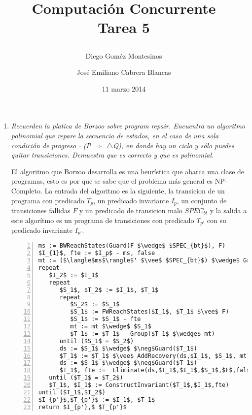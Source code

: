 \documentclass{article}
\title{ Computación Concurrente \\ \Large{Tarea 5}
\author{
  Diego Goméz Montesinos
  \and
  José Emiliano Cabrera Blancas
  }
\date{11 marzo 2014}
}
\begin{document}
\maketitle
\begin{enumerate}
  
\item{
    \textsl{
      Recuerden la platica de Borzoo sobre \textit{program
        repair}. Encuentra un algoritmo polinomial que repare la
      secuencia de estados, en el caso de una sola condición de
      progreso $\square$ (P $\Rightarrow$ $\triangle$Q), en donde hay
      un ciclo y sólo puedes quitar transiciones. Demuestra que es
      correcto y que es polinomial.\\
    }
 
    El algoritmo que Borzoo desarrolla es una heurística que abarca
    una clase de programas, esto es por que se sabe que el problema más
    general es NP-Completo. La entrada del algoritmo es la siguiente,
    la transicion de un programa con predicado $T_p$, un predicado
    invariante $I_p$, un conjunto de transiciones fallidas $F$ y un
    predicado de transicion malo $SPEC_{bt}$ y la salida a este
    algorítmo es un programa de transiciones con predicado $T_{p'}$
    con su predicado invariante $I_{p'}$.\\
    
\begin{lstlisting}[frame=single,mathescape,numbers=left,emph={repeat,until,return},emphstyle=\textbf]
ms := BWReachStates(Guard(F $\wedge$ $SPEC_{bt}$), F)
$I_{1}$, fte := $I_p$ - ms, false
mt := ($\langle$ms$\rangle$' $\vee$ $SPEC_{bt}$) $\wedge$ Group($\neg$ms)
repeat
   $I_2$ := $I_1$
   repeat
      $S_1$, $T_2$ := $I_1$, $T_1$
      repeat
         $S_2$ := $S_1$
         $S_1$ := FWReachStates($I_1$, $T_1$ $\vee$ F)
         $S_1$ := $S_1$ - fte
         mt := mt $\wedge$ $S_1$
         $T_1$ := $T_1$ - Group($T_1$ $\wedge$ mt)
      until ($S_1$ = $S_2$)
      ds := $S_1$ $\wedge$ $\neg$Guard($T_1$)
      $T_1$ := $T_1$ $\vee$ AddRecovery(ds,$I_1$, $S_1$, mt)
      ds := $S_1$ $\wedge$ $\neg$Guard($T_1$)
      $T_1$, fte :=  Eliminate(ds,$T_1$,$I_1$,$S_1$,$F$,false,false)
   until ($T_1$ = $T_2$)
   $T_1$, $I_1$ := ConstructInvariant($T_1$,$I_1$,fte)
until ($T_1$,$I_2$)
$I_{p'}$,$T_{p'}$ := $I_1$, $T_1$
return $I_{p'},$ $T_{p'}$
\end{lstlisting}

}
\end{enumerate}
\end{document}
